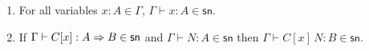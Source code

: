 \documentclass{article}
\newcommand{\csn}{\mathsf{sn}}
\newcommand{\red}{\longrightarrow}
\newcommand{\redsn}{\longrightarrow_\csn}
\begin{document}
\begin{lemma}\label{lm:closn}$\;$
  \begin{enumerate}
  \item\label{cp2} For all variables $x:A \in \Gamma$, $\Gamma \vdash x : A \in \csn$.
  \item\label{cp3} If $\Gamma \vdash C[x] : A \arrow B \in \csn$ and $\Gamma \vdash N : A \in \csn$
     then $\Gamma \vdash C[x]\,N : B \in \csn$.
\end{enumerate}
\end{lemma}
\end{document}

